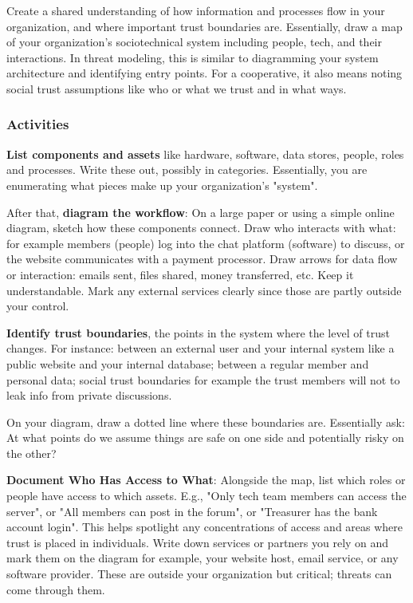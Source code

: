 Create a shared understanding of how information and processes flow in your
organization, and where important trust boundaries are. Essentially, draw a map of your
organization's sociotechnical system including people, tech, and their
interactions. In threat modeling, this is similar to diagramming your system
architecture and identifying entry points. For a cooperative, it also means
noting social trust assumptions like who or what we trust and in what ways.

\subsubsection{Activities}

\textbf{List components and assets} like hardware, software, data stores,
people, roles and processes. Write these out, possibly in categories.
Essentially, you are enumerating what pieces make up your organization's "system".

After that, \textbf{diagram the workflow}: On a large paper or using a simple online diagram,
sketch how these components connect. Draw who interacts with what:
for example members (people) log into the chat platform (software) to discuss,
or the website communicates with a payment processor. Draw arrows for data flow
or interaction: emails sent, files shared, money transferred, etc. Keep it
understandable. Mark any external services clearly since those are partly
outside your control.

\textbf{Identify trust boundaries}, the points in the system where the
level of trust changes. For instance: between an external user and your
internal system like a public website and your internal database; between
a regular member and personal data; social trust boundaries for example
the trust members will not to leak info from private discussions.

On your diagram, draw a dotted line where these boundaries are.
Essentially ask: At what points do we assume things are safe on one side
and potentially risky on the other?

\textbf{Document Who Has Access to What}: Alongside the map, list which roles or people have
access to which assets. E.g., "Only tech team members can access the server", or "All
members can post in the forum", or "Treasurer has the bank account login". This
helps spotlight any concentrations of access and areas where trust is placed in
individuals. Write down services or partners you rely on and mark them on the
diagram for example, your website host, email service, or any software
provider. These are outside your organization but critical; threats can come through them.




